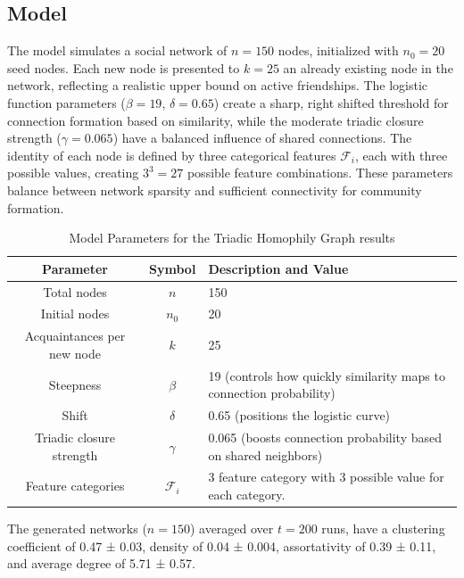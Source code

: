 \documentclass[runningheads]{llncs}
\begin{document}
\subsection{Model}

The model simulates a social network of $n=150$ nodes, initialized with $n_0=20$ seed nodes. Each new node is presented to $k=25$ an already existing node in the network, reflecting a realistic upper bound on active friendships. The logistic function parameters ($\beta=19$, $\delta=0.65$) create a sharp, right shifted threshold for connection formation based on similarity, while the moderate triadic closure strength ($\gamma=0.065$) have a  balanced influence of shared connections. The identity of each node is defined by three categorical features $\mathcal{F}_i$, each with three possible values, creating $3^3=27$ possible feature combinations. These parameters balance between network sparsity and sufficient connectivity for community formation.

\begin{table}[ht]
\centering
\caption{Model Parameters for the Triadic Homophily Graph results}
\begin{tabular}{|c|c|l|}
\hline
\textbf{Parameter} & \textbf{Symbol} & \textbf{Description and Value} \\ \hline
Total nodes        & $n$             & 150 \\ \hline
Initial nodes      & $n_0$           & 20 \\ \hline
Acquaintances per new node & $k$    & 25 \\ \hline
Steepness          & $\beta$         & 19 (controls how quickly similarity maps to connection probability) \\ \hline
Shift              & $\delta$        & 0.65 (positions the logistic curve) \\ \hline
Triadic closure strength & $\gamma$ & 0.065 (boosts connection probability based on shared neighbors) \\ \hline
Feature categories & $\mathcal{F}_i$             &  3 feature category with 3 possible value for each category. \\ \hline
\end{tabular}
\label{tab:parameters}
\end{table}


The generated networks ($n=150$) averaged over $t = 200$ runs, have a clustering coefficient of 0.47 ± 0.03, density of 0.04 ± 0.004, assortativity of 0.39 ± 0.11, and average degree of 5.71 ± 0.57.
\end{document}
